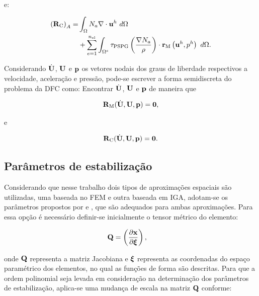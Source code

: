 \documentclass[tese_patricia]{subfiles}%
\begin{document}
\noindent e:

\begin{align}
	\begin{split}
	\left(\mathbf{R}_\mathrm{C}\right)_{A} = &\int_{\Omega} N_a \nabla \cdot \mathbf{u}^h \ d\Omega \\ 
	&+ \sum_{e=1}^{n_{\mathrm{el}}} \int_{\Omega^e} \tau_{\mathrm{PSPG}} \left(\frac{\nabla N_a}{\rho}\right) \cdot \mathbf{r}_{\mathrm{M}}\left(\mathbf{u}^h,p^h\right) \  d\Omega.
	\end{split}
\end{align}
		
Considerando $\dot{\mathbf{U}}$, $\mathbf{U}$ e $\mathbf{p}$ os vetores nodais dos graus de liberdade respectivos a velocidade, aceleração e pressão, pode-se escrever a forma semidiscreta do problema da DFC como: Encontrar $\dot{\mathbf{U}}$, $\mathbf{U}$ e $\mathbf{p}$ de maneira que

\begin{align}
\mathbf{R}_\mathrm{M}(\dot{\mathbf{U}},\mathbf{U},\mathbf{p}) = \mathbf{0},\label{eq:momentum_residual}
\end{align}

\noindent e

\begin{align}
\mathbf{R}_\mathrm{C}(\dot{\mathbf{U}},\mathbf{U},\mathbf{p}) = \mathbf{0}. \label{eq:continuity_residual}
\end{align}


\subsection{Parâmetros de estabilização}\label{subsec:taus}

Considerando que nesse trabalho dois tipos de aproximações espaciais são utilizadas, uma baseada no FEM e outra baseada em IGA, adotam-se os parâmetros propostos por  e , que são adequados para ambas aproximações. Para essa opção é necessário definir-se inicialmente o tensor métrico do elemento:

\begin{align}
\mathbf{Q}&=\left(\frac{\partial\mathbf{x}}{\partial\bm{\xi}}\right),
\end{align}

\noindent onde $\mathbf{Q}$ representa a matriz Jacobiana e $\bm{\xi}$ representa as coordenadas do espaço paramétrico dos elementos, no qual as funções de forma são descritas. Para que a ordem polinomial seja levada em consideração na determinação dos parâmetros de estabilização, aplica-se uma mudança de escala na matriz $\mathbf{Q}$ conforme:
\end{document}
